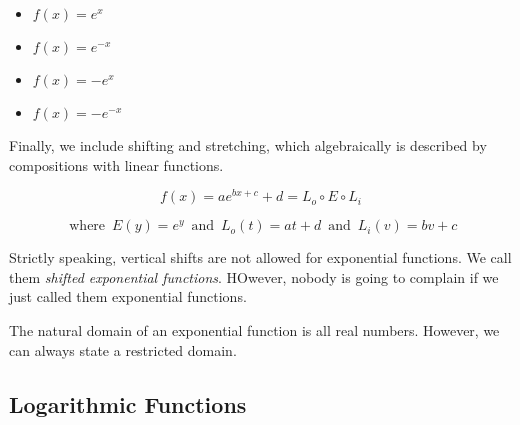 \documentclass{ximera}
\begin{document}
\begin{template}
\begin{itemize}
\item $f(x) = e^x$ 
\item $f(x) = e^{-x}$ 
\item $f(x) = -e^x$ 
\item $f(x) = -e^{-x}$ 
\end{itemize}






Finally, we include shifting and stretching, which algebraically is described by compositions with linear functions.


\[ f(x) = a e^{b x + c} + d = L_o \circ E \circ L_i\]

\[
\text{ where } \,  E(y) = e^y   \,  \text{ and } \,   L_o(t) = a t + d    \,  \text{ and } \,   L_i(v) = b v + c
\]



Strictly speaking, vertical shifts are not allowed for exponential functions.  We call them \textit{shifted exponential functions}.  HOwever, nobody is going to complain if we just called them exponential functions.






\end{template}





The natural domain of an exponential function is all real numbers.  However, we can always state a restricted domain. \\









\subsection{Logarithmic Functions}
\end{document}
